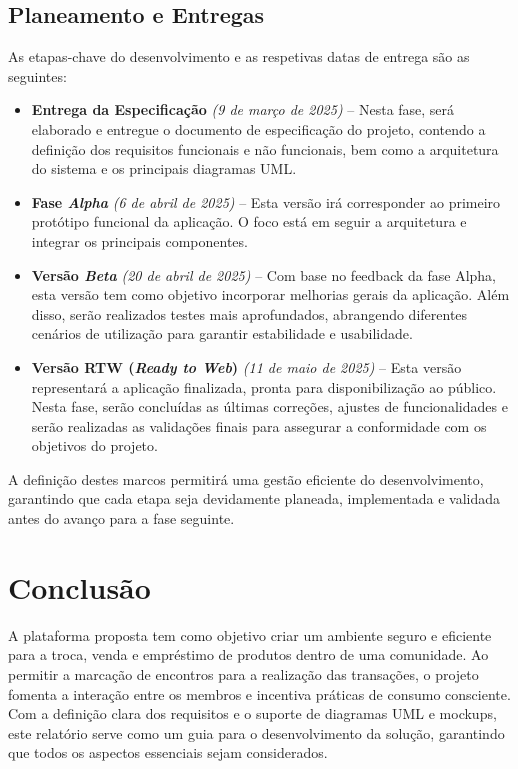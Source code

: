 \documentclass[a4paper, 12pt]{article} %
\begin{document}
\subsection{Planeamento e Entregas}

As etapas-chave do desenvolvimento e as respetivas datas de entrega são as seguintes:

\begin{itemize}
	\item \textbf{Entrega da Especificação} \textit{(9 de março de 2025)} – Nesta fase, será elaborado e entregue o documento de especificação do projeto, contendo a definição dos requisitos funcionais e não funcionais, bem como a arquitetura do sistema e os principais diagramas UML.
	
	\item \textbf{Fase \textit{Alpha}} \textit{(6 de abril de 2025)} – Esta versão irá corresponder ao primeiro protótipo funcional da aplicação. O foco está em seguir a arquitetura e integrar os principais componentes.
	
	\item \textbf{Versão \textit{Beta}} \textit{(20 de abril de 2025)} – Com base no feedback da fase Alpha, esta versão tem como objetivo incorporar melhorias gerais da aplicação. Além disso, serão realizados testes mais aprofundados, abrangendo diferentes cenários de utilização para garantir estabilidade e usabilidade.
	
	\item \textbf{Versão RTW (\textit{Ready to Web})} \textit{(11 de maio de 2025)} – Esta versão representará a aplicação finalizada, pronta para disponibilização ao público. Nesta fase, serão concluídas as últimas correções, ajustes de funcionalidades e serão realizadas as validações finais para assegurar a conformidade com os objetivos do projeto.
\end{itemize}

A definição destes marcos permitirá uma gestão eficiente do desenvolvimento, garantindo que cada etapa seja devidamente planeada, implementada e validada antes do avanço para a fase seguinte.

\newpage
\section{Conclusão}

A plataforma proposta tem como objetivo criar um ambiente seguro e eficiente para a troca, venda e empréstimo de produtos dentro de uma comunidade. Ao permitir a marcação de encontros para a realização das transações, o projeto fomenta a interação entre os membros e incentiva práticas de consumo consciente. 
Com a definição clara dos requisitos e o suporte de diagramas UML e mockups, este relatório serve como um guia para o desenvolvimento da solução, garantindo que todos os aspectos essenciais sejam considerados.

\newpage


\printbibliography
\end{document}

